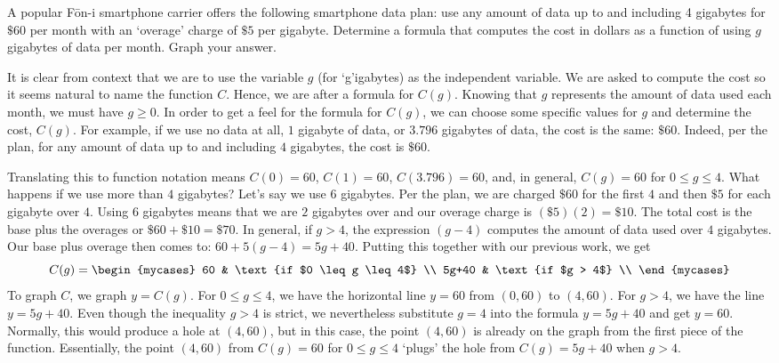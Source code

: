 \documentclass{ximera}
\begin{document}
\begin{example}  \label{dataplanex} A popular F\={o}n-i smartphone carrier offers the following smartphone data plan: use any amount of data up to and including 4 gigabytes for $\$ 60$ per month with an `overage' charge of $ \$5$ per gigabyte.  Determine a formula that computes the cost in dollars as a function of using $g$ gigabytes of data per month. Graph your answer.

\begin{explanation}  
It is clear from context that we are to use the variable $g$ (for `g'igabytes) as the independent variable.  We are asked to compute the cost so it seems natural to name the function $C$.  Hence, we are after a formula for $C(g)$.  Knowing that $g$ represents the amount of data used each month, we must have $g \geq 0$.  In order to get a feel for the formula for $C(g)$, we can choose some specific values for $g$ and determine the cost, $C(g)$.  For example, if we use no data at all, $1$ gigabyte of data,  or $3.796$ gigabytes of data, the cost is the same:  $\$60$.  Indeed, per the plan, for any amount of data up to and including $4$ gigabytes, the cost is $\$60$.  



Translating this to function notation means $C(0) = 60$, $C(1) = 60$, $C(3.796) = 60$, and, in general, $C(g) = 60$ for  $0 \leq g \leq 4$.  What happens if we use more than $4$ gigabytes?  Let's say we use $6$ gigabytes.  Per the plan, we are charged $\$60$ for the first $4$ and then $\$5$ for each gigabyte over $4$.  Using $6$ gigabytes means that we are $2$ gigabytes over and our overage charge is $ (\$ 5)(2) = \$ 10$.  The total cost is the base plus the overages or $\$60 + \$10 = \$70$.  In general, if $g>4$, the expression $(g-4)$ computes the amount of data used over $4$ gigabytes.  Our base plus overage then comes to: $60 + 5(g-4) = 5g+40$.  Putting this together with our previous work, we get \[ C(g)  = \begin{mycases} 
      60 &  \text{if $0 \leq g \leq 4$} \\
      5g+40   & \text{if $g > 4$} \\
   \end{mycases}
\] To graph $C$, we graph $y = C(g)$.  For $0 \leq g \leq 4$, we have the horizontal line $y = 60$ from $(0,60)$ to $(4,60)$.  For $g>4$, we have the line $y = 5g+ 40$.  Even though the inequality $g > 4$ is strict, we nevertheless substitute $g = 4$ into the formula $y = 5g + 40$ and get $y = 60$.  Normally, this would produce a hole at $(4, 60)$, but in this case, the point $(4, 60)$ is already on the graph from the first piece of the function.  Essentially, the point $(4,60)$ from $C(g) = 60$ for $0 \leq g \leq 4$ `plugs' the hole from $C(g) = 5g + 40$ when $g> 4$.   




\end{explanation}
\end{example}
\end{document}
